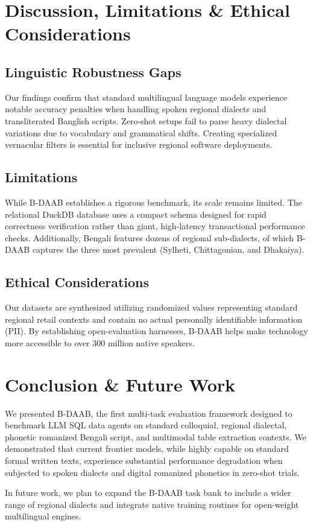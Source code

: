 \documentclass[11pt,a4paper]{article}
\begin{document}
\section{Discussion, Limitations & Ethical Considerations}
\subsection{Linguistic Robustness Gaps}
Our findings confirm that standard multilingual language models experience notable accuracy penalties when handling spoken regional dialects and transliterated Banglish scripts. Zero-shot setups fail to parse heavy dialectal variations due to vocabulary and grammatical shifts. Creating specialized vernacular filters is essential for inclusive regional software deployments.

\subsection{Limitations}
While B-DAAB establishes a rigorous benchmark, its scale remains limited. The relational DuckDB database uses a compact schema designed for rapid correctness verification rather than giant, high-latency transactional performance checks. Additionally, Bengali features dozens of regional sub-dialects, of which B-DAAB captures the three most prevalent (Sylheti, Chittagonian, and Dhakaiya).

\subsection{Ethical Considerations}
Our datasets are synthesized utilizing randomized values representing standard regional retail contexts and contain no actual personally identifiable information (PII). By establishing open-evaluation harnesses, B-DAAB helps make technology more accessible to over 300 million native speakers.

\section{Conclusion & Future Work}
We presented B-DAAB, the first multi-task evaluation framework designed to benchmark LLM SQL data agents on standard colloquial, regional dialectal, phonetic romanized Bengali script, and multimodal table extraction contexts. We demonstrated that current frontier models, while highly capable on standard formal written texts, experience substantial performance degradation when subjected to spoken dialects and digital romanized phonetics in zero-shot trials.

In future work, we plan to expand the B-DAAB task bank to include a wider range of regional dialects and integrate native training routines for open-weight multilingual engines.



\end{document}
